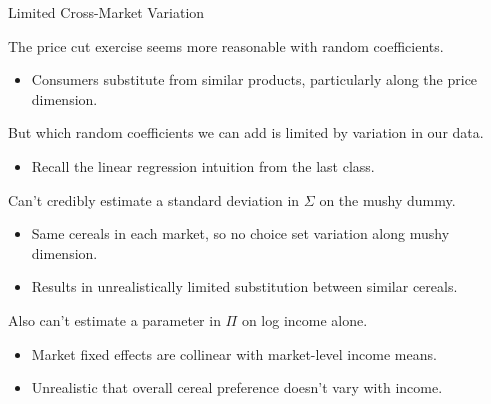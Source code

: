\documentclass[aspectratio=169,t,11pt,table]{beamer}
\begin{document}
\begin{frame}{Limited Cross-Market Variation}
    \begin{wideitemize}
        \item The price cut exercise seems more reasonable with random coefficients.
        \begin{itemize}
            \item Consumers substitute from similar products, particularly along the price dimension.
        \end{itemize}
        \pause
        \item But which random coefficients we can add is limited by variation in our data.
        \begin{itemize}
            \item Recall the linear regression intuition from the last class.
        \end{itemize}
        \pause
        \item Can't credibly estimate a standard deviation in $\Sigma$ on the mushy dummy.
        \begin{itemize}
            \item Same cereals in each market, so no choice set variation along mushy dimension.
            \item Results in unrealistically limited substitution between similar cereals.
        \end{itemize}
        \pause
        \item Also can't estimate a parameter in $\Pi$ on log income alone.
        \begin{itemize}
            \item Market fixed effects are collinear with market-level income means.
            \item Unrealistic that overall cereal preference doesn't vary with income.
        \end{itemize}
    \end{wideitemize}
\end{frame}
\end{document}
